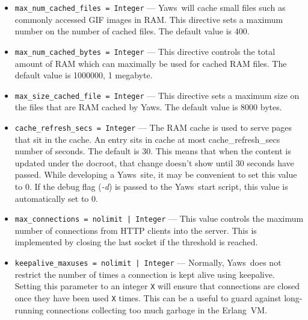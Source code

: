 \documentclass[11pt,oneside,english]{book}
\newcommand{\Erlang}            %
        {{\sc Erlang}}
\newcommand{\Yaws}            %
        {{\sc Yaws}}
\begin{document}
\begin{itemize}
\item        \verb+max_num_cached_files = Integer+ ---
              \Yaws\   will  cache  small  files  such  as  commonly
              accessed  GIF images in RAM.  This directive sets a
              maximum number on the number of cached files.   The
              default value is 400.

\item        \verb+max_num_cached_bytes = Integer+ ---
              This  directive  controls  the  total amount of RAM
              which can maximally be used for cached  RAM  files.
              The default value is 1000000, 1 megabyte.

\item        \verb+max_size_cached_file = Integer+ ---
              This  directive  sets  a  maximum size on the files
              that are RAM cached by \Yaws{}.  The default value is
              8000 bytes.

\item        \verb+cache_refresh_secs = Integer+ ---
              The  RAM  cache  is used to serve pages that sit in
              the  cache.  An  entry  sits  in  cache   at   most
              cache\_refresh\_secs  number  of seconds. The default
              is 30. This means that when the content is  updated
              under  the  docroot, that change doesn't show until
              30 seconds have passed.  While  developing  a  \Yaws\
              site,  it may be convenient to set this value to 0.
              If the debug flag (\textit{-d}) is passed to the
              \Yaws\   start script, this value is automatically set
              to 0.

\item        \verb+max_connections = nolimit | Integer+ ---
              This value controls the maximum number of connections
              from HTTP clients into the server. This is implemented
              by closing the last socket if the threshold is reached.

\item        \verb+keepalive_maxuses = nolimit | Integer+ ---
              Normally, \Yaws\ does not restrict the number of times a
              connection is kept alive using keepalive. Setting this
              parameter to an integer \verb+X+ will ensure that
              connections are closed once they have been used \verb+X+
              times.  This can be a useful to guard against
              long-running connections collecting too much garbage in
              the \Erlang\ VM.


\end{itemize}
\end{document}
